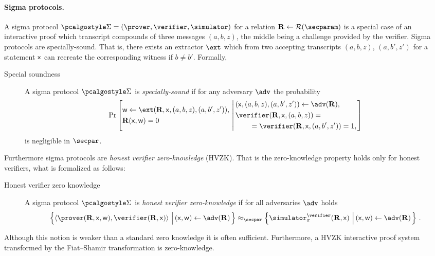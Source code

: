 \documentclass[runningheads,11pt]{llncs}
\theoremstyle{definition}
\begin{document}
\paragraph{Sigma protocols.}
A sigma protocol $\sigmaprot = (\prover, \verifier, \simulator)$  for a relation $\REL \gets \RELGEN(\secparam)$ is a special case of an interactive proof which transcript compounds of three messages $(a, b, z)$, the middle being a challenge provided by the verifier.
Sigma protocols are specially-sound. That is, there exists an extractor $\ext$ which from two accepting transcripts $(a, b, z)$, $(a, b', z')$ for a statement $\mathsf{x}$ can recreate the corresponding witness if $b \neq b'$. Formally,
\begin{description}
	\item[Special soundness] A sigma protocol $\sigmaprot$ is \emph{specially-sound} if for any adversary $\adv$ the probability
	\[
		\Pr\left[
		\begin{aligned}
				& \wit \gets \ext(\REL, \inp, (a, b, z), (a, b', z')),\\
				& \REL(\inp, \wit) = 0
		\end{aligned}
		\,\left|\,
		\begin{aligned}
			& (\inp, (a, b, z), (a, b', z')) \gets \adv(\REL), \\
			& \verifier(\REL, \inp, (a, b, z)) = \\
			& \qquad = \verifier(\REL, \inp, (a, b', z')) = 1, \\
		\end{aligned}
		\right.\right]
	\]
	is negligible in $\secpar$.
\end{description}

Furthermore sigma protocols are \emph{honest verifier zero-knowledge} (HVZK). That is the zero-knowledge property holds only for honest verifiers, what is formalized as follows:
\begin{description}
	\item[Honest verifier zero knowledge] A sigma protocol $\sigmaprot$ is \emph{honest verifier zero-knowledge} if for all adversaries $\adv$ holds
	\begin{multline*}
		\left\{\ip{\prover(\REL, \inp, \wit)}{\verifier(\REL, \inp)} \,\left|\, (\inp, \wit) \gets \adv(\REL)\vphantom{\simulator_\zkproof^\adv}\right.\right\} \approx_\secpar
		\left\{\simulator_\zkproof^{\verifier}(\REL, \inp)\,\left|\, (\inp, \wit) \gets \adv(\REL)\vphantom{\simulator^\adv}\right.\right\}\,.
	\end{multline*}
\end{description}
Although this notion is weaker than a standard zero knowledge it is often sufficient. Furthermore, a HVZK interactive proof system transformed by the Fiat--Shamir transformation is zero-knowledge.
\end{document}
